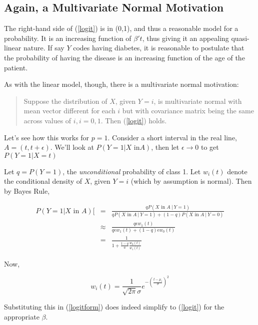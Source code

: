\subsection{Again, a Multivariate Normal Motivation}

The right-hand side of (\ref{logit}) is in (0,1), and thus a reasonable
model for a probability.  It is an increasing function of $\beta't$,
thus giving it an appealing quasi-linear nature.  If say $Y$ codes
having diabetes, it is reasonable to postulate that the probability of
having the disease is an increasing function of the age of the patient.

As with the linear model, though, there is a multivariate normal
motivation:

\begin{quote}
Suppose the distribution of $X$, given $Y = i$, is multivariate normal
with mean vector different for each $i$ but with covariance matrix being
the same across values of $i, i = 0,1$.  Then (\ref{logit}) holds.
\end{quote}

Let's see how this works for $p = 1$.  Consider a short interval in the
real line, $A = (t,t+\epsilon)$.  We'll look at $P(Y = 1 | X \textrm{ in
} A)$, then let $\epsilon \rightarrow 0$ to get $P(Y = 1 | X = t)$

Let $q = P(Y = 1)$, the \textit{unconditional} probability of class 1.
Let $w_i(t)$ denote the conditional density of $X$, given $Y = i$ (which
by assumption is normal).  Then by Bayes Rule,

\begin{eqnarray}
P(Y = 1 | X \textrm{ in } A) [&=& 
\frac
{q P(X \textrm{ in } A ~|~  Y = 1)}
{
{q P(X \textrm{ in } A ~|~ Y = 1)} +
(1-q) P(X \textrm{ in } A ~|~ Y = 0) 
} \\
&\approx&  
\frac{q \epsilon w_1(t)}
{q \epsilon w_1(t) + (1-q) \epsilon w_0(t)} \\
&=& 
\label{logitform}
\frac{1}{1 + \frac{1-q}{a} \frac{w_0(t)}{w_1(t)}}
\end{eqnarray}

Now, 

\begin{equation}
w_i(t) = 
\frac{1}{\sqrt{2 \pi} \sigma}
e^{- \left ( \frac{t-\mu_i}{\sigma} \right )^2}
\end{equation}

Substituting this in (\ref{logitform}) does indeed simplify to
(\ref{logit}) for the appropriate $\beta$.

